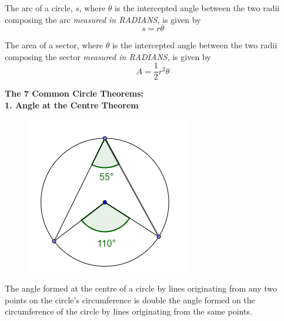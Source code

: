 \documentclass{article}
\begin{document}
            \noindent The arc of a circle, $s$, where $\theta$ is the intercepted angle between the
            two radii composing the arc \textit{measured in RADIANS}, is given by \\

            \begin{equation*}
                s=r\theta
            \end{equation*}

            \noindent The area of a sector, where $\theta$ is the intercepted angle between the two
            radii composing the sector \textit{measured in RADIANS}, is given by \\

            \begin{equation*}
                A=\frac{1}{2} r^2 \theta
            \end{equation*}

            \noindent \color{purple} \textbf{The 7 Common Circle Theorems:} \color{black} \\

            \noindent \color{purple} \textbf{1. Angle at the Centre Theorem} \color{black} \\

            \begin{figure} [hbt!]
                \centering
                \includegraphics[scale=0.6]{Resources/Unit4Circles/circle1.PNG}
            \end{figure}

            \noindent The angle formed at the centre of a circle by lines originating from any two
            points on the circle's circumference is double the angle formed on the circumference of
            the circle by lines originating from the same points. \\
\end{document}
